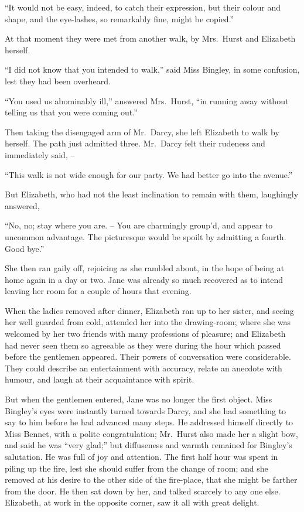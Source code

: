 “It would not be easy, indeed, to catch their expression,
but their colour and shape, and the eye-lashes, so remarkably
fine, might be copied.”

At that moment they were met from another walk, by
Mrs.\ Hurst and Elizabeth herself.

“I did not know that you intended to walk,” said
Miss Bingley, in some confusion, lest they had been
overheard.

“You used us abominably ill,” answered Mrs.\ Hurst,
“in running away without telling us that you were coming
out.”

Then taking the disengaged arm of Mr.\ Darcy, she left
Elizabeth to walk by herself. The path just admitted
three. Mr.\ Darcy felt their rudeness and immediately
said, --

“This walk is not wide enough for our party. We had
better go into the avenue.”

But Elizabeth, who had not the least inclination to
remain with them, laughingly answered,

“No, no; stay where you are. -- You are charmingly
group’d, and appear to uncommon advantage. The
picturesque would be spoilt by admitting a fourth.
Good bye.”

She then ran gaily off, rejoicing as she rambled about,
in the hope of being at home again in a day or two. Jane
was already so much recovered as to intend leaving her
room for a couple of hours that evening.


When the ladies removed after dinner, Elizabeth ran
up to her sister, and seeing her well guarded from cold,
attended her into the drawing-room; where she was
welcomed by her two friends with many professions of
pleasure; and Elizabeth had never seen them so agreeable
as they were during the hour which passed before
the gentlemen appeared. Their powers of conversation
were considerable. They could describe an entertainment
with accuracy, relate an anecdote with humour, and laugh
at their acquaintance with spirit.

But when the gentlemen entered, Jane was no longer
the first object. Miss Bingley’s eyes were instantly turned
towards Darcy, and she had something to say to him
before he had advanced many steps. He addressed himself
directly to Miss Bennet, with a polite congratulation;
Mr.\ Hurst also made her a slight bow, and said he was
“very glad;” but diffuseness and warmth remained for
Bingley’s salutation. He was full of joy and attention.
The first half hour was spent in piling up the fire, lest she
should suffer from the change of room; and she removed
at his desire to the other side of the fire-place, that she
might be farther from the door. He then sat down by
her, and talked scarcely to any one else. Elizabeth, at
work in the opposite corner, saw it all with great delight.

